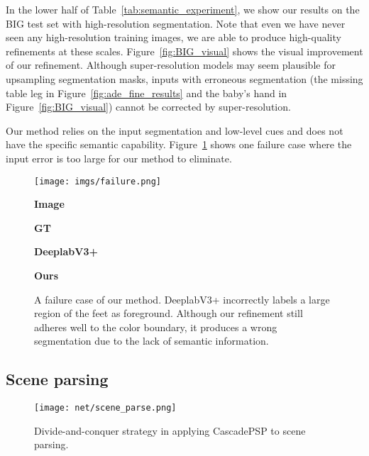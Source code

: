 \documentclass[10pt,twocolumn,letterpaper]{article}
\begin{document}
In the lower half of Table~\ref{tab:semantic_experiment}, we show our results on the BIG test set with high-resolution segmentation. Note that even we have never seen any high-resolution training images, we are able to produce high-quality refinements at these scales. Figure~\ref{fig:BIG_visual} shows the visual improvement of our refinement.
Although super-resolution models \cite{dong2015image, wang2018esrgan} may seem plausible for upsampling segmentation masks, inputs with erroneous segmentation (\eg the missing table leg in Figure~\ref{fig:ade_fine_results} and the baby's hand in Figure~\ref{fig:BIG_visual}) cannot be corrected by super-resolution.

Our method relies on the input segmentation and low-level cues and does not have the specific semantic capability.
Figure~\ref{fig:failure} shows one failure case where the input error is too large for our method to eliminate.

\begin{figure}[t]
\centering
	\texttt{[image: imgs/failure.png]}
    	\begin{center}
        	\textbf{Image}
    	\end{center}
	\endminipage\hfill
    	\begin{center}
        	\textbf{GT}
    	\end{center}
	\endminipage\hfill
    	\begin{center}
        	\textbf{DeeplabV3+}
    	\end{center}
	\endminipage\hfill
    	\begin{center}
        	\textbf{Ours}
    	\end{center}
	\endminipage\hfill
	\caption{A failure case of our method. DeeplabV3+ incorrectly labels a large region of the feet as foreground. Although our refinement still adheres well to the color boundary, it produces a wrong segmentation due to the lack of semantic information. }
	\label{fig:failure}
	\vspace{-0.15in}
\end{figure}



\subsection{Scene parsing}
\begin{figure}
\centering
\texttt{[image: net/scene\_parse.png]}
\caption{Divide-and-conquer strategy in applying CascadePSP to scene parsing.}
\label{fig:scene_parsing}
\vspace{-0.3in}
\end{figure}
\end{document}
